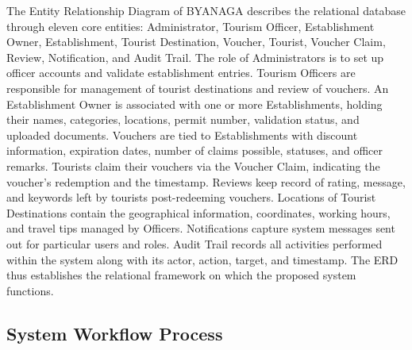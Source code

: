 \documentclass{research}
\begin{document}
The Entity Relationship Diagram of BYANAGA describes the relational database through eleven core entities: Administrator, Tourism Officer, Establishment Owner, Establishment, Tourist Destination, Voucher, Tourist, Voucher Claim, Review, Notification, and Audit Trail.
The role of Administrators is to set up officer accounts and validate establishment entries. Tourism Officers are responsible for management of tourist destinations and review of vouchers. An Establishment Owner is associated with one or more Establishments, holding their names, categories, locations, permit number, validation status, and uploaded documents. Vouchers are tied to Establishments with discount information, expiration dates, number of claims possible, statuses, and officer remarks. Tourists claim their vouchers via the Voucher Claim, indicating the voucher's redemption and the timestamp. Reviews keep record of rating, message, and keywords left by tourists post-redeeming vouchers. Locations of Tourist Destinations contain the geographical information, coordinates, working hours, and travel tips managed by Officers. Notifications capture system messages sent out for particular users and roles. Audit Trail records all activities performed within the system along with its actor, action, target, and timestamp.
The ERD thus establishes the relational framework on which the proposed system functions.

\subsection{System Workflow Process}
\end{document}
